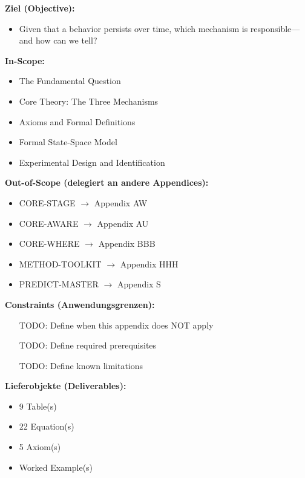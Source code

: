 \begin{tcolorbox}[
    colback=orange!5!white,
    colframe=orange!75!black,
    title={\textbf{Appendix Scope: Ziel / In-Scope / Out-of-Scope / Constraints}},
    fonttitle=\bfseries
]

\textbf{Ziel (Objective):}
\begin{itemize}[nosep]
    \item Given that a behavior persists over time, which mechanism is responsible---and how can we tell?
\end{itemize}

\textbf{In-Scope:}
\begin{itemize}[nosep]
    \item The Fundamental Question
    \item Core Theory: The Three Mechanisms
    \item Axioms and Formal Definitions
    \item Formal State-Space Model
    \item Experimental Design and Identification
\end{itemize}

\textbf{Out-of-Scope (delegiert an andere Appendices):}
\begin{itemize}[nosep]
    \item CORE-STAGE $\rightarrow$ Appendix AW
    \item CORE-AWARE $\rightarrow$ Appendix AU
    \item CORE-WHERE $\rightarrow$ Appendix BBB
    \item METHOD-TOOLKIT $\rightarrow$ Appendix HHH
    \item PREDICT-MASTER $\rightarrow$ Appendix S
\end{itemize}

\textbf{Constraints (Anwendungsgrenzen):}
\begin{itemize}[nosep]
    \item [TODO: Define when this appendix does NOT apply]
    \item [TODO: Define required prerequisites]
    \item [TODO: Define known limitations]
\end{itemize}

\textbf{Lieferobjekte (Deliverables):}
\begin{itemize}[nosep]
    \item 9 Table(s)
    \item 22 Equation(s)
    \item 5 Axiom(s)
    \item Worked Example(s)
\end{itemize}

\end{tcolorbox}




